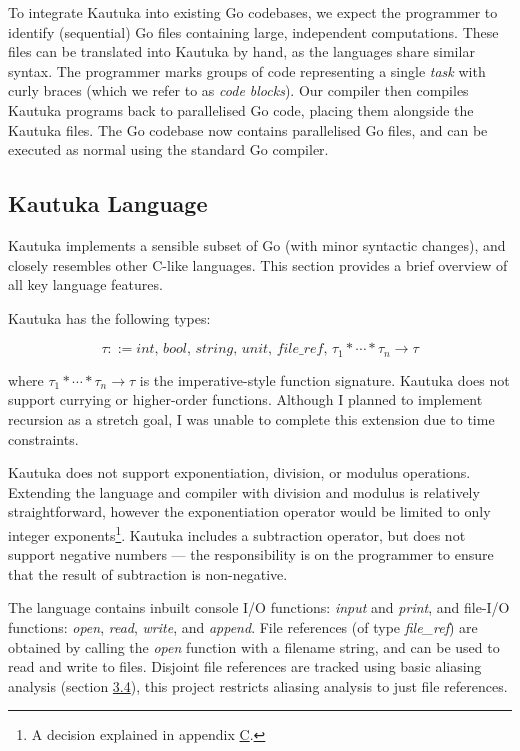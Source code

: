 To integrate Kautuka into existing Go codebases, we expect the programmer to identify (sequential) Go files containing large, independent computations. These files can be translated into Kautuka by hand, as the languages share similar syntax. The programmer marks groups of code representing a single \textit{task} with curly braces (which we refer to as \textit{code blocks}). Our compiler then compiles Kautuka programs back to parallelised Go code, placing them alongside the Kautuka files. The Go codebase now contains parallelised Go files, and can be executed as normal using the standard Go compiler.

\subsection{Kautuka Language}

\label{sec:2.1.2}

Kautuka implements a sensible subset of Go (with minor syntactic changes), and closely resembles other C-like languages. This section provides a brief overview of all key language features.

Kautuka has the following types:

\vspace{-2mm}

\[ \tau ::= \textit{int, bool, string, unit, file\_ref, } \tau_1 * \cdots * \tau_n \rightarrow \tau \]

\vspace{-3mm}

where \( \tau_1 * \cdots * \tau_n \rightarrow \tau \) is the imperative-style function signature. Kautuka does not support currying or higher-order functions. Although I planned to implement recursion as a stretch goal, I was unable to complete this extension due to time constraints.

Kautuka does not support exponentiation, division, or modulus operations. Extending the language and compiler with division and modulus is relatively straightforward, however the exponentiation operator would be limited to only integer exponents\footnote{A decision explained in appendix \hyperref[sec:C]{C}.}. Kautuka includes a subtraction operator, but does not support negative numbers --- the responsibility is on the programmer to ensure that the result of subtraction is non-negative.

The language contains inbuilt console I/O functions: \textit{input} and \textit{print}, and file-I/O functions: \textit{open}, \textit{read}, \textit{write}, and \textit{append}. File references (of type \textit{file\_ref}) are obtained by calling the \textit{open} function with a filename string, and can be used to read and write to files. Disjoint file references are tracked using basic aliasing analysis (section \hyperref[sec:3.4]{3.4}), this project restricts aliasing analysis to just file references.

